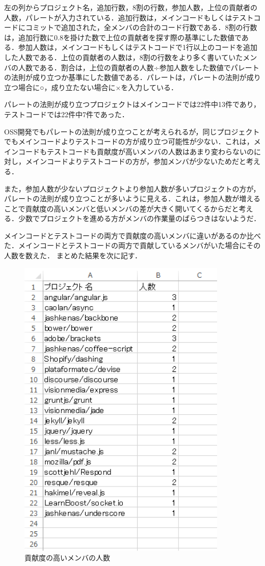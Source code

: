 左の列からプロジェクト名，追加行数，8割の行数，参加人数，上位の貢献者の人数，パレートが入力されている．追加行数は，メインコードもしくはテストコードにコミットで追加された，全メンバの合計のコード行数である．8割の行数は，追加行数に0.8を掛けた数で上位の貢献者を探す際の基準にした数値である．参加人数は，メインコードもしくはテストコードで1行以上のコードを追加した人数である．上位の貢献者の人数は，8割の行数をより多く書いていたメンバの人数である．割合は，上位の貢献者の人数÷参加人数をした数値でパレートの法則が成り立つか基準にした数値である．パレートは，パレートの法則が成り立つ場合に○，成り立たない場合に×を入力している．

パレートの法則が成り立つプロジェクトはメインコードでは22件中13件であり，テストコードでは22件中7件であった．

OSS開発でもパレートの法則が成り立つことが考えられるが，同じプロジェクトでもメインコードよりテストコードの方が成り立つ可能性が少ない．これは，メインコードもテストコードも貢献度が高いメンバの人数はあまり変わらないのに対し，メインコードよりテストコードの方が，参加メンバが少ないためだと考える．

また，参加人数が少ないプロジェクトより参加人数が多いプロジェクトの方が，パレートの法則が成り立つことが多いように見える．これは，参加人数が増えることで貢献度の高いメンバと低いメンバの差が大きく開いてくるからだと考える．少数でプロジェクトを進める方がメンバの作業量のばらつきはないようだ．

\newpage

メインコードとテストコードの両方で貢献度の高いメンバに違いがあるのか比べた．メインコードとテストコードの両方で貢献しているメンバがいた場合にその人数を数えた．
まとめた結果を次に記す．

\begin{figure}[h]
\centering
\includegraphics[width=10cm]{matome3.png}
\caption{貢献度の高いメンバの人数}
\end{figure}

